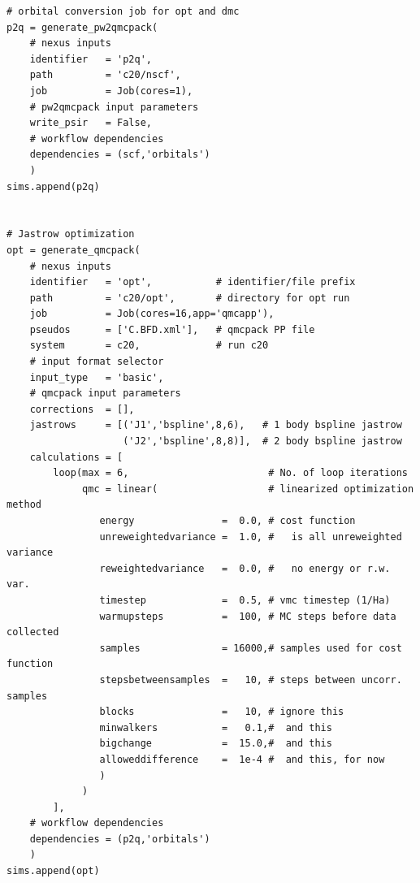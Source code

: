 \documentclass[oneside,11pt]{memoir}
\numberwithin{equation}{section}
\begin{document}
\begin{verbatim}
# orbital conversion job for opt and dmc
p2q = generate_pw2qmcpack(
    # nexus inputs
    identifier   = 'p2q',
    path         = 'c20/nscf',
    job          = Job(cores=1),
    # pw2qmcpack input parameters
    write_psir   = False,
    # workflow dependencies
    dependencies = (scf,'orbitals')
    )
sims.append(p2q)


# Jastrow optimization
opt = generate_qmcpack(
    # nexus inputs
    identifier   = 'opt',           # identifier/file prefix
    path         = 'c20/opt',       # directory for opt run
    job          = Job(cores=16,app='qmcapp'),
    pseudos      = ['C.BFD.xml'],   # qmcpack PP file
    system       = c20,             # run c20
    # input format selector   
    input_type   = 'basic',
    # qmcpack input parameters
    corrections  = [], 
    jastrows     = [('J1','bspline',8,6),   # 1 body bspline jastrow
                    ('J2','bspline',8,8)],  # 2 body bspline jastrow
    calculations = [
        loop(max = 6,                        # No. of loop iterations
             qmc = linear(                   # linearized optimization method
                energy               =  0.0, # cost function
                unreweightedvariance =  1.0, #   is all unreweighted variance
                reweightedvariance   =  0.0, #   no energy or r.w. var. 
                timestep             =  0.5, # vmc timestep (1/Ha)
                warmupsteps          =  100, # MC steps before data collected 
                samples              = 16000,# samples used for cost function 
                stepsbetweensamples  =   10, # steps between uncorr. samples
                blocks               =   10, # ignore this  
                minwalkers           =   0.1,#  and this
                bigchange            =  15.0,#  and this
                alloweddifference    =  1e-4 #  and this, for now
                )
             )        
        ],
    # workflow dependencies
    dependencies = (p2q,'orbitals')        
    )
sims.append(opt)


\end{verbatim}
\end{document}
